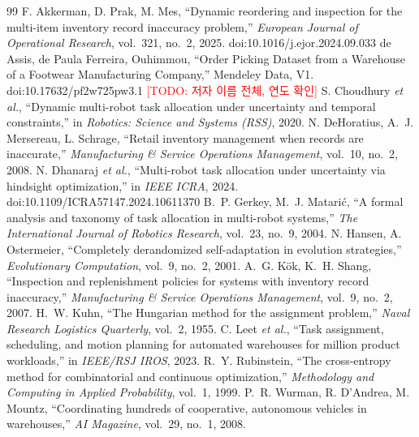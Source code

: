\documentclass[10pt,twocolumn]{article}
\newcommand{\todo}[1]{\textcolor{red}{[TODO: #1]}}
\begin{document}
\begin{thebibliography}{99}
 F. Akkerman, D. Prak, M. Mes, ``Dynamic reordering and inspection for the multi-item inventory record inaccuracy problem,'' \emph{European Journal of Operational Research}, vol.~321, no.~2, 2025. doi:10.1016/j.ejor.2024.09.033
 de Assis, de Paula Ferreira, Ouhimmou, ``Order Picking Dataset from a Warehouse of a Footwear Manufacturing Company,'' Mendeley Data, V1. doi:10.17632/pf2w725pw3.1 \todo{저자 이름 전체, 연도 확인}
 S. Choudhury \emph{et al.}, ``Dynamic multi-robot task allocation under uncertainty and temporal constraints,'' in \emph{Robotics: Science and Systems (RSS)}, 2020.
 N. DeHoratius, A.~J. Mersereau, L. Schrage, ``Retail inventory management when records are inaccurate,'' \emph{Manufacturing \& Service Operations Management}, vol.~10, no.~2, 2008.
 N. Dhanaraj \emph{et al.}, ``Multi-robot task allocation under uncertainty via hindsight optimization,'' in \emph{IEEE ICRA}, 2024. doi:10.1109/ICRA57147.2024.10611370
 B.~P. Gerkey, M.~J. Matari\'{c}, ``A formal analysis and taxonomy of task allocation in multi-robot systems,'' \emph{The International Journal of Robotics Research}, vol.~23, no.~9, 2004.
 N. Hansen, A. Ostermeier, ``Completely derandomized self-adaptation in evolution strategies,'' \emph{Evolutionary Computation}, vol.~9, no.~2, 2001.
 A.~G. K\"{o}k, K.~H. Shang, ``Inspection and replenishment policies for systems with inventory record inaccuracy,'' \emph{Manufacturing \& Service Operations Management}, vol.~9, no.~2, 2007.
 H.~W. Kuhn, ``The Hungarian method for the assignment problem,'' \emph{Naval Research Logistics Quarterly}, vol.~2, 1955.
 C. Leet \emph{et al.}, ``Task assignment, scheduling, and motion planning for automated warehouses for million product workloads,'' in \emph{IEEE/RSJ IROS}, 2023.
 R.~Y. Rubinstein, ``The cross-entropy method for combinatorial and continuous optimization,'' \emph{Methodology and Computing in Applied Probability}, vol.~1, 1999.
 P.~R. Wurman, R. D'Andrea, M. Mountz, ``Coordinating hundreds of cooperative, autonomous vehicles in warehouses,'' \emph{AI Magazine}, vol.~29, no.~1, 2008.
\end{thebibliography}
\end{document}
